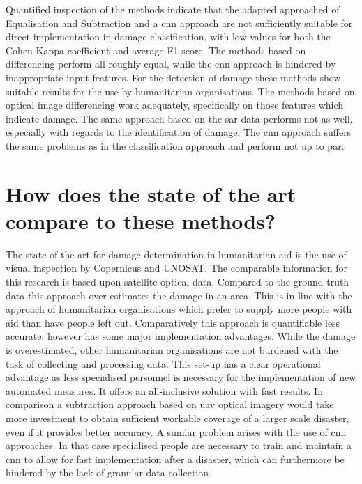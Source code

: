 \noindent Quantified inspection of the methods indicate that the adapted approached of Equalisation and Subtraction and a \ac{cnn} approach are not sufficiently suitable for direct implementation in damage classification, with low values for both the Cohen Kappa coefficient and average F1-score. The methods based on differencing perform all roughly equal, while the \ac{cnn} approach is hindered by inappropriate input features. For the detection of damage these methods show suitable results for the use by humanitarian organisations. The methods based on optical image differencing work adequately, specifically on those features which indicate damage. The same approach based on the \ac{sar} data performs not as well, especially with regards to the identification of damage. The \ac{cnn} approach suffers the same problems as in the classification approach and perform not up to par.

\section{How does the state of the art compare to these methods?}
The state of the art for damage determination in humanitarian aid is the use of visual inspection by Copernicus and UNOSAT. The comparable information for this research is based upon satellite optical data. Compared to the ground truth data this approach over-estimates the damage in an area. This is in line with the approach of humanitarian organisations which prefer to supply more people with aid than have people left out. Comparatively this approach is quantifiable less accurate, however has some major implementation advantages. While the damage is overestimated, other humanitarian organisations are not burdened with the task of collecting and processing data. This set-up has a clear operational advantage as less specialised personnel is necessary for the implementation of new automated measures. It offers an all-inclusive solution with fast results. In comparison a subtraction approach based on \ac{uav} optical imagery would take more investment to obtain sufficient workable coverage of a larger scale disaster, even if it provides better accuracy. A similar problem arises with the use of \ac{cnn} approaches. In that case specialised people are necessary to train and maintain a \ac{cnn} to allow for fast implementation after a disaster, which can furthermore be hindered by the lack of granular data collection.

